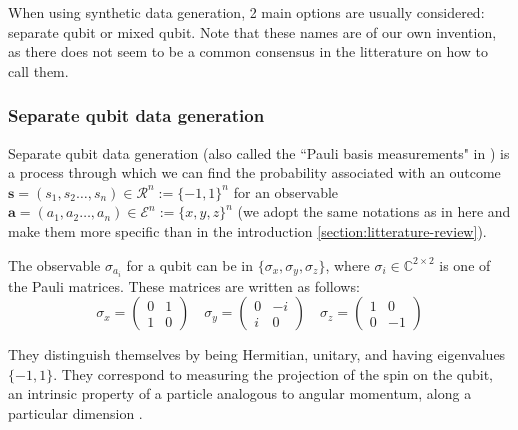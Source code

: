 \documentclass[12pt]{memoir}
\newcommand{\mb}{\mathbf}
\begin{document}
When using synthetic data generation, 2 main options are usually considered: separate qubit or mixed qubit. Note that these names are of our own invention, as there does not seem to be a common consensus in the litterature on how to call them.


\subsubsection*{Separate qubit data generation}\label{section:sep-qub-dg}

Separate qubit data generation (also called the ``Pauli basis measurements" in \cite{Guta20}) is a process through which we can find the probability associated with an outcome $\mb s = (s_1, s_2 \dots, s_n) \in \mathcal{R}^n := \{-1, 1\}^n $ for an observable $\mb a = (a_1, a_2 \dots, a_n) \in \mathcal{E}^n := \{x,y,z\}^n$ (we adopt the same notations as in \cite{MA17} here and make them more specific than in the introduction \ref{section:litterature-review}).\medbreak


The observable $\sigma_{a_i}$ for a qubit can be in $\{\sigma_x, \sigma_y, \sigma_z\}$, where $\sigma_i \in \mathbb{C}^{2 \times 2}$ is one of the Pauli matrices. These matrices are written as follows:
\begin{equation}
    \sigma_x  = \begin{pmatrix}

        0 & 1\\

        1 & 0

    \end{pmatrix}\quad
    \sigma_y = \begin{pmatrix}

        0 & -i\\

        i & 0

    \end{pmatrix}\quad
    \sigma_z = \begin{pmatrix}

        1 & 0\\

        0 & -1

    \end{pmatrix}
\end{equation}

They distinguish themselves by being Hermitian, unitary, and having eigenvalues $\{-1, 1\}$. They correspond to measuring the projection of the spin on the qubit, an intrinsic property of a particle analogous to angular momentum, along a particular dimension \cite{wiki:pauli-matrices}.
\end{document}

